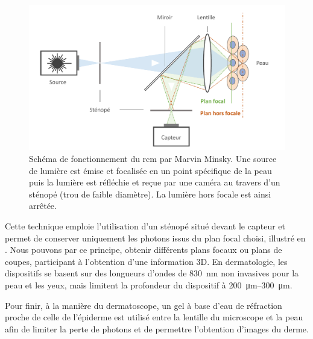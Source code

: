 \addtocounter{footnote}{1}

\begin{figure}[H]
\centering
    \includegraphics[width=0.9\linewidth]{contents/chapter_2/resources/scheme_principle_rcm.pdf}
    \caption{Schéma de fonctionnement du \gls{rcm} par Marvin Minsky. Une source de lumière est émise et focalisée en un point spécifique de la peau puis la lumière est réfléchie et reçue par une caméra au travers d'un sténopé (trou de faible diamètre). La lumière hors focale est ainsi arrêtée.}
    \label{fig:scheme_principle_rcm}
\end{figure}\par

Cette technique emploie l’utilisation d’un sténopé situé devant le capteur et permet de conserver uniquement les photons issus du plan focal choisi, illustré en . Nous pouvons par ce principe, obtenir différents plans focaux ou plans de coupes, participant à l’obtention d’une information 3D. En dermatologie, les dispositifs se basent sur des longueurs d’ondes de \SI{830}{\nano\metre} non invasives pour la peau et les yeux, mais limitent la profondeur du dispositif à \SIrange{200}{300}{\micro\metre}.\par

Pour finir, à la manière du dermatoscope, un gel à base d’eau de réfraction proche de celle de l’épiderme est utilisé entre la lentille du microscope et la peau afin de limiter la perte de photons et de permettre l’obtention d’images du derme.\par


